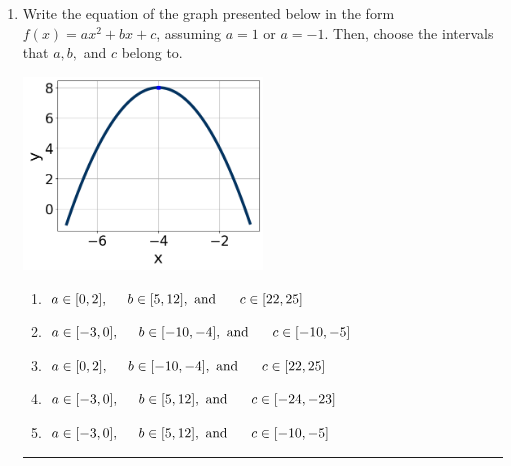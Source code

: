 \documentclass[14pt]{extbook}
\newcommand{\litem}[1]{\item#1\hspace*{-1cm}\rule{\textwidth}{0.4pt}}
\begin{document}
\begin{enumerate}
{\begin{enumerate}[label=\Alph*.]
\end{enumerate} }
\litem{
Write the equation of the graph presented below in the form $f(x)=ax^2+bx+c$, assuming  $a=1$ or $a=-1$. Then, choose the intervals that $a, b,$ and $c$ belong to.
\begin{center}
    \includegraphics[width=0.5\textwidth]{../Figures/quadraticGraphToEquationCopyC.png}
\end{center}
\begin{enumerate}[label=\Alph*.]
\item \( a \in [0, 2], \hspace*{5mm} b \in [5, 12], \text{ and } \hspace*{5mm} c \in [22, 25] \)
\item \( a \in [-3, 0], \hspace*{5mm} b \in [-10, -4], \text{ and } \hspace*{5mm} c \in [-10, -5] \)
\item \( a \in [0, 2], \hspace*{5mm} b \in [-10, -4], \text{ and } \hspace*{5mm} c \in [22, 25] \)
\item \( a \in [-3, 0], \hspace*{5mm} b \in [5, 12], \text{ and } \hspace*{5mm} c \in [-24, -23] \)
\item \( a \in [-3, 0], \hspace*{5mm} b \in [5, 12], \text{ and } \hspace*{5mm} c \in [-10, -5] \)


\end{enumerate}}
\end{enumerate}
\end{document}
